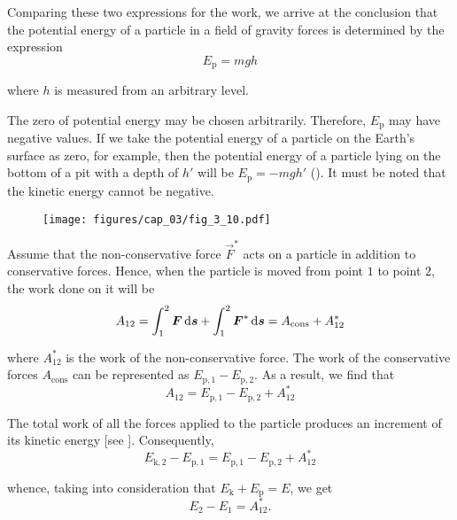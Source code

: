 \noindent
Comparing these two expressions for the work, we arrive at the conclusion that the potential energy of a particle in a field of gravity forces is determined by the expression
\begin{equation}\label{eq:3_36}
E_{\text{p}} = mgh
\end{equation}

\noindent
where $h$ is measured from an arbitrary level.

The zero of potential energy may be chosen arbitrarily. Therefore, $E_{\text{p}}$ may have negative values. If we take the potential energy of a particle on the Earth's surface as zero, for example, then the potential energy of a particle lying on the bottom of a pit with a depth of $h'$ will be $E_{\text{p}}=-mgh'$ (). It must be noted that the kinetic energy cannot be negative.

\begin{figure}[t]
	\begin{center}
		\texttt{[image: figures/cap\_03/fig\_3\_10.pdf]}
		\caption[]{}
		\label{fig:3_10}
	\end{center}
	\vspace{-0.7cm}
\end{figure}

Assume that the non-conservative force $\vec{F}^*$ acts on a particle in addition to conservative forces. Hence, when the particle is moved from point $1$ to point $2$, the work done on it will be
\begin{equation*}
A_{12} = \int_{1}^{2} \boldsymbol{F}\,\mathrm{d}\boldsymbol{s} + \int_{1}^{2} \boldsymbol{F}^*\,\mathrm{d}\boldsymbol{s} = A_{\text{cons}} + A_{12}^*
\end{equation*}

\noindent
where $A_{12}^*$ is the work of the non-conservative force. The work of the conservative forces $A_{\text{cons}}$ can be represented as $E_{\text{p},1}-E_{\text{p},2}$. As a result, we find that
\begin{equation*}
A_{12} = E_{\text{p},1} - E_{\text{p},2} + A_{12}^*
\end{equation*}

\noindent
The total work of all the forces applied to the particle produces an increment of its kinetic energy [see ]. Consequently,
\begin{equation*}
E_{\text{k},2} - E_{\text{p},1} = E_{\text{p},1} - E_{\text{p},2} + A_{12}^*
\end{equation*}

\noindent
whence, taking into consideration that $E_{\text{k}}+E_{\text{p}}=E$, we get
\begin{equation}\label{eq:3_37}
E_2 - E_1 = A_{12}^*.
\end{equation}

